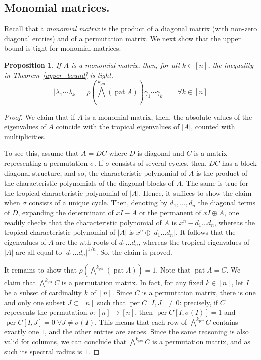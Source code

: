 \documentclass[a4paper]{amsart}
\theoremstyle{definition}
\theoremstyle{plain}
\newtheorem{prop}[thm]{Proposition}
\theoremstyle{remark}
\begin{document}
\subsection{Monomial matrices.}
Recall that a {\em monomial matrix} is the product of a diagonal matrix (with
non-zero diagonal entries) and of a permutation matrix. We next show
that
the upper bound is tight for monomial matrices.
\begin{prop}
If $A$ is a monomial matrix, then, for all $k\in[n]$,
the inequality in Theorem~\ref{upper_bound} is tight,
\begin{equation}
\label{eq_perm}
|\lambda_1\dotsm\lambda_k| = \rho({\mbox{$\bigwedge$}}^k_\operatorname{per} (\operatorname{pat} A)) \gamma_1\dotsm\gamma_k\qquad\forall k\in[n]
\end{equation}
\end{prop} 
\begin{proof}
We claim that if $A$ is a monomial matrix, then, the absolute values of the eigenvalues
of $A$ coincide with the tropical eigenvalues of $|A|$, counted
with multiplicities. 

To see this, assume that $A=DC$ where $D$
is diagonal and $C$ is a matrix representing a permutation
$\sigma$. If $\sigma$ consists of several cycles, then, $DC$
has a block diagonal structure, and so, the characteristic
polynomial of $A$ is the product of the characteristic
polynomials of the diagonal blocks of $A$. The same
is true for the tropical characteristic polynomial of $|A|$.
Hence, it suffices to show the claim when $\sigma$
consists of a unique cycle. Then, denoting by $d_1,\dots,d_n$
the diagonal terms of $D$, expanding the determinant of $xI-A$ or the permanent
of $xI\oplus A$, one readily checks that
the characteristic polynomial of $A$ is $x^n-d_1\dots d_n$,
whereas the tropical characteristic polynomial of $|A|$
is $x^n\oplus |d_1\dots d_n|$. It follows that the
eigenvalues of $A$ are the $n$th roots of $d_1\dots d_n$,
whereas the tropical eigenvalues of $|A|$ are all equal to $|d_1\dots d_n|^{1/n}$. So, the claim is proved.

It remains to show that $\rho(\bigwedge^k_\operatorname{per} (\operatorname{pat} A)) = 1$. Note that $\operatorname{pat} A=C$.
We claim that $\bigwedge^k_\operatorname{per} C$ is a permutation matrix.
In fact, for any fixed $k\in[n]$,
let $I$ be a subset of cardinality $k$ of $[n]$.
Since $C$ is a permutation matrix, there is one and only one subset $J\subset[n]$ such that
$\operatorname{per} C[I,J] \neq 0$: precisely, if $C$ represents the permutation $\sigma\colon[n]\to[n]$,
then $\operatorname{per} C[I,\sigma(I)] = 1$ and $\operatorname{per} C[I,J] = 0 \; \forall J \neq \sigma(I)$.
This means that each row of $\bigwedge^k_\operatorname{per} C$ contains exactly one $1$, and the other entries are zeroes.
Since the same reasoning is also valid for columns, we can conclude that $\bigwedge^k_\operatorname{per} C$ is a permutation matrix,
and as such its spectral radius is $1$.
\end{proof}
\end{document}
